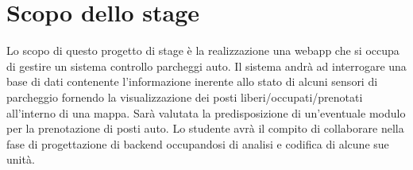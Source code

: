 \section*{Scopo dello stage}
Lo scopo di questo progetto di stage è la realizzazione una webapp che si occupa di gestire un sistema controllo parcheggi auto.
Il sistema andrà ad interrogare una base di dati contenente l'informazione inerente allo stato di alcuni sensori di parcheggio  
fornendo la visualizzazione dei posti liberi/occupati/prenotati all'interno di una mappa.
Sarà valutata la predisposizione di un'eventuale modulo per la prenotazione di posti auto.
Lo studente avrà il compito di collaborare nella fase di progettazione di backend occupandosi di analisi e codifica di alcune sue unità.

